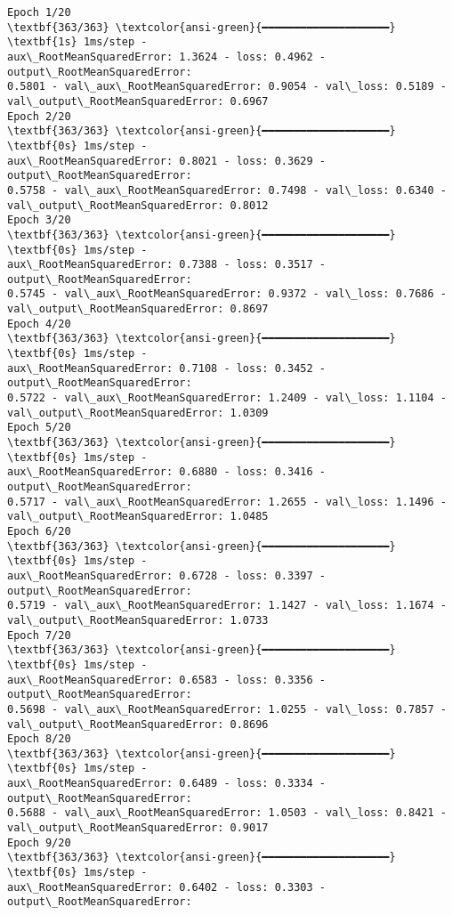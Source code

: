 \documentclass[12pt letter]{report}
\begin{document}
    \begin{Verbatim}[commandchars=\\\{\}]
Epoch 1/20
\textbf{363/363} \textcolor{ansi-green}{━━━━━━━━━━━━━━━━━━━━} \textbf{1s} 1ms/step -
aux\_RootMeanSquaredError: 1.3624 - loss: 0.4962 - output\_RootMeanSquaredError:
0.5801 - val\_aux\_RootMeanSquaredError: 0.9054 - val\_loss: 0.5189 -
val\_output\_RootMeanSquaredError: 0.6967
Epoch 2/20
\textbf{363/363} \textcolor{ansi-green}{━━━━━━━━━━━━━━━━━━━━} \textbf{0s} 1ms/step -
aux\_RootMeanSquaredError: 0.8021 - loss: 0.3629 - output\_RootMeanSquaredError:
0.5758 - val\_aux\_RootMeanSquaredError: 0.7498 - val\_loss: 0.6340 -
val\_output\_RootMeanSquaredError: 0.8012
Epoch 3/20
\textbf{363/363} \textcolor{ansi-green}{━━━━━━━━━━━━━━━━━━━━} \textbf{0s} 1ms/step -
aux\_RootMeanSquaredError: 0.7388 - loss: 0.3517 - output\_RootMeanSquaredError:
0.5745 - val\_aux\_RootMeanSquaredError: 0.9372 - val\_loss: 0.7686 -
val\_output\_RootMeanSquaredError: 0.8697
Epoch 4/20
\textbf{363/363} \textcolor{ansi-green}{━━━━━━━━━━━━━━━━━━━━} \textbf{0s} 1ms/step -
aux\_RootMeanSquaredError: 0.7108 - loss: 0.3452 - output\_RootMeanSquaredError:
0.5722 - val\_aux\_RootMeanSquaredError: 1.2409 - val\_loss: 1.1104 -
val\_output\_RootMeanSquaredError: 1.0309
Epoch 5/20
\textbf{363/363} \textcolor{ansi-green}{━━━━━━━━━━━━━━━━━━━━} \textbf{0s} 1ms/step -
aux\_RootMeanSquaredError: 0.6880 - loss: 0.3416 - output\_RootMeanSquaredError:
0.5717 - val\_aux\_RootMeanSquaredError: 1.2655 - val\_loss: 1.1496 -
val\_output\_RootMeanSquaredError: 1.0485
Epoch 6/20
\textbf{363/363} \textcolor{ansi-green}{━━━━━━━━━━━━━━━━━━━━} \textbf{0s} 1ms/step -
aux\_RootMeanSquaredError: 0.6728 - loss: 0.3397 - output\_RootMeanSquaredError:
0.5719 - val\_aux\_RootMeanSquaredError: 1.1427 - val\_loss: 1.1674 -
val\_output\_RootMeanSquaredError: 1.0733
Epoch 7/20
\textbf{363/363} \textcolor{ansi-green}{━━━━━━━━━━━━━━━━━━━━} \textbf{0s} 1ms/step -
aux\_RootMeanSquaredError: 0.6583 - loss: 0.3356 - output\_RootMeanSquaredError:
0.5698 - val\_aux\_RootMeanSquaredError: 1.0255 - val\_loss: 0.7857 -
val\_output\_RootMeanSquaredError: 0.8696
Epoch 8/20
\textbf{363/363} \textcolor{ansi-green}{━━━━━━━━━━━━━━━━━━━━} \textbf{0s} 1ms/step -
aux\_RootMeanSquaredError: 0.6489 - loss: 0.3334 - output\_RootMeanSquaredError:
0.5688 - val\_aux\_RootMeanSquaredError: 1.0503 - val\_loss: 0.8421 -
val\_output\_RootMeanSquaredError: 0.9017
Epoch 9/20
\textbf{363/363} \textcolor{ansi-green}{━━━━━━━━━━━━━━━━━━━━} \textbf{0s} 1ms/step -
aux\_RootMeanSquaredError: 0.6402 - loss: 0.3303 - output\_RootMeanSquaredError:

\end{Verbatim}
\end{document}

